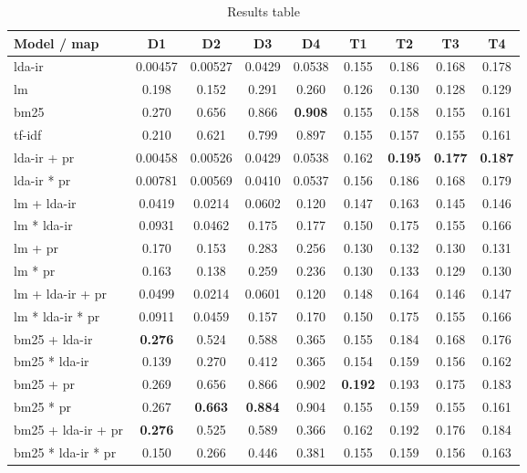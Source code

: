 \begin{table*}[h]
	\centering
	\caption{Results table}
	\begin{tabular}{l|c|c|c|c|c|c|c|c}
		Model / \gls{map} & D1 & D2 & D3 & D4 & T1 & T2 & T3 & T4 \\
		\midrule
		\gls{lda}-\gls{ir} & 0.00457 & 0.00527 & 0.0429 & 0.0538 & 0.155 & 0.186 & 0.168 & 0.178 \\
		\gls{lm} & 0.198 & 0.152 & 0.291 & 0.260 & 0.126 & 0.130 & 0.128 & 0.129 \\
		\gls{bm25} & 0.270 & 0.656 & 0.866 & \textbf{0.908} & 0.155 & 0.158 & 0.155 & 0.161 \\
		\gls{tf-idf} & 0.210 & 0.621 & 0.799 & 0.897 & 0.155 & 0.157 & 0.155 & 0.161 \\
		\gls{lda}-\gls{ir} + \gls{pr} & 0.00458 & 0.00526 & 0.0429 & 0.0538 & 0.162 & \textbf{0.195} & \textbf{0.177} & \textbf{0.187} \\
		\gls{lda}-\gls{ir} * \gls{pr} & 0.00781 & 0.00569 & 0.0410 & 0.0537 & 0.156 & 0.186 & 0.168 & 0.179 \\
		\gls{lm} + \gls{lda}-\gls{ir} & 0.0419 & 0.0214 & 0.0602 & 0.120 & 0.147 & 0.163 & 0.145 & 0.146 \\
		\gls{lm} * \gls{lda}-\gls{ir} & 0.0931 & 0.0462 & 0.175 & 0.177 & 0.150 & 0.175 & 0.155 & 0.166 \\
		\gls{lm} + \gls{pr} & 0.170 & 0.153 & 0.283 & 0.256 & 0.130 & 0.132 & 0.130 & 0.131 \\
		\gls{lm} * \gls{pr} & 0.163 & 0.138 & 0.259 & 0.236 & 0.130 & 0.133 & 0.129 & 0.130 \\
		\gls{lm} + \gls{lda}-\gls{ir} + \gls{pr} & 0.0499 & 0.0214 & 0.0601 & 0.120 & 0.148 & 0.164 & 0.146 & 0.147 \\
		\gls{lm} * \gls{lda}-\gls{ir} * \gls{pr} & 0.0911 & 0.0459  & 0.157 & 0.170 & 0.150 & 0.175 & 0.155 & 0.166 \\
		\gls{bm25} + \gls{lda}-\gls{ir} & \textbf{0.276} & 0.524 & 0.588 & 0.365 & 0.155 & 0.184 & 0.168 & 0.176 \\
		\gls{bm25} * \gls{lda}-\gls{ir} & 0.139 & 0.270 & 0.412 & 0.365 & 0.154 & 0.159 & 0.156 & 0.162 \\
		\gls{bm25} + \gls{pr} & 0.269 & 0.656 & 0.866 & 0.902 & \textbf{0.192} & 0.193 & 0.175 & 0.183 \\
		\gls{bm25} * \gls{pr} & 0.267 & \textbf{0.663} & \textbf{0.884} & 0.904 & 0.155 & 0.159 & 0.155 & 0.161 \\
		\gls{bm25} + \gls{lda}-\gls{ir} + \gls{pr} & \textbf{0.276} & 0.525 & 0.589 & 0.366 & 0.162 & 0.192 & 0.176 & 0.184 \\
		\gls{bm25} * \gls{lda}-\gls{ir} * \gls{pr} & 0.150 & 0.266 & 0.446 & 0.381 & 0.155 & 0.159 & 0.156 & 0.163 \\
	\end{tabular}
	
	\label{tab:results}
\end{table*}


